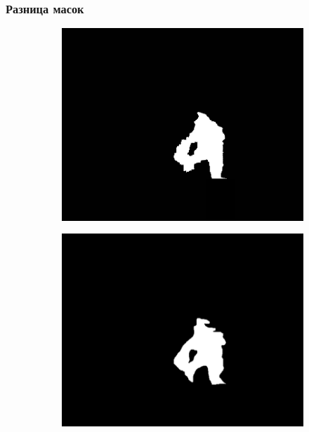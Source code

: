 \documentclass[t]{beamer}
\begin{document}
	\begin{frame}
		\frametitle{Разница масок}
		\vspace*{-0.35cm}
		\begin{figure}[h!]
			\begin{subfigure}{.30\textwidth}
				\centering
				\includegraphics[width = \textwidth]{image/examples/mask/206}
			\end{subfigure}
			\begin{subfigure}{.30\textwidth}
				\centering
				\includegraphics[width = \textwidth]{image/examples/mask_razmet/206}
			\end{subfigure}

\end{figure}
\end{frame}
\end{document}

